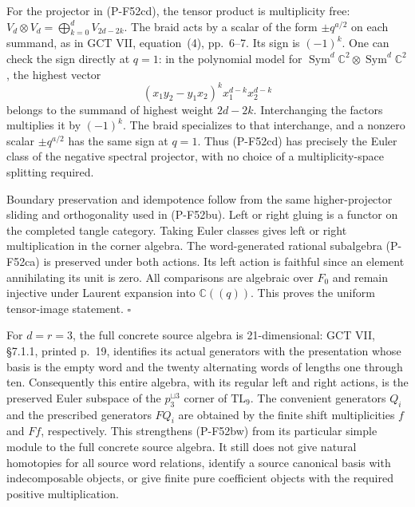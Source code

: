 For the projector in (P-F52cd), the tensor product is
multiplicity free:
$V_d\otimes V_d=\bigoplus_{k=0}^dV_{2d-2k}$.
The braid acts by a scalar of the form $\pm q^{a/2}$
on each summand, as in GCT VII, equation~(4), pp.~6--7.
Its sign is $(-1)^k$.  One can check the sign directly
at $q=1$: in the polynomial model for
$\operatorname{Sym}^d\mathbb C^2\otimes
 \operatorname{Sym}^d\mathbb C^2$, the highest vector
\[
 (x_1y_2-y_1x_2)^k x_1^{d-k}x_2^{d-k}
                                                               \tag{P-F52ce}
\]
belongs to the summand of highest weight $2d-2k$.
Interchanging the factors multiplies it by $(-1)^k$.
The braid specializes to that interchange, and a nonzero
scalar $\pm q^{a/2}$ has the same sign at $q=1$.
Thus (P-F52cd) has precisely the Euler class of the
negative spectral projector, with no choice of a
multiplicity-space splitting required.

Boundary preservation and idempotence follow from the
same higher-projector sliding and orthogonality used in
(P-F52bu).  Left or right gluing is a functor on the
completed tangle category.  Taking Euler classes gives
left or right multiplication in the corner algebra.
The word-generated rational subalgebra (P-F52ca) is
preserved under both actions.  Its left action is
faithful since an element annihilating its unit is zero.
All comparisons are algebraic over $F_0$ and remain
injective under Laurent expansion into $\mathbb C((q))$.
This proves the uniform tensor-image statement.
\hfill$\square$

For $d=r=3$, the full concrete source algebra is
21-dimensional: GCT VII, \S7.1.1, printed p.~19,
identifies its actual generators with the presentation
whose basis is the empty word and the twenty alternating
words of lengths one through ten.  Consequently this
entire algebra, with its regular left and right actions,
is the preserved Euler subspace of the
$p_3^{\sqcup3}$ corner of $\mathrm{TL}_9$.
The convenient generators $Q_i$ and the prescribed
generators $FQ_i$ are obtained by the finite shift
multiplicities $f$ and $Ff$, respectively.
This strengthens (P-F52bw) from its particular simple
module to the full concrete source algebra.  It still
does not give natural homotopies for all source word
relations, identify a source canonical basis with
indecomposable objects, or give finite pure coefficient
objects with the required positive multiplication.

